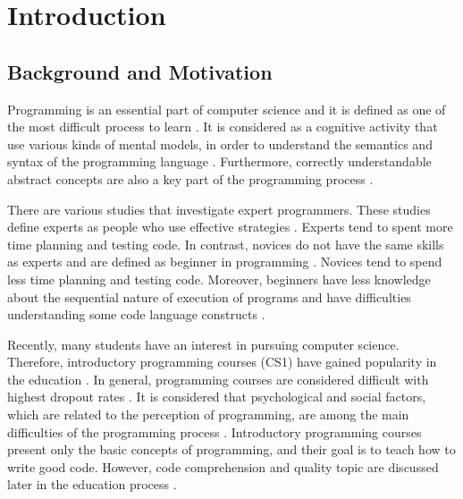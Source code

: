 %
%

\chapter{Introduction}
\label{sec:introduction}


\section{Background and Motivation}

Programming is an essential part of computer science and it is defined as one of the most difficult process to learn \cite{andrzejewska2020development}. It is considered as a cognitive activity that use various kinds of mental models, in order to understand the semantics and syntax of the programming language \cite{andrzejewska2020development}.
Furthermore, correctly understandable abstract concepts are also a key part of the programming process \cite{lahtinen2005study}.

There are various studies that investigate expert programmers. These studies define experts as people who use effective strategies \cite{robins2003learning}.   Experts tend to spent more time planning and testing code. In contrast, novices do not have the same skills as experts and are defined as beginner in programming \cite{robins2003learning}. Novices tend to spend less time planning and testing code. Moreover, beginners have less knowledge about the sequential nature of execution of programs and have difficulties understanding some code language constructs \cite{robins2003learning}.


Recently, many students have an interest in pursuing computer science. Therefore, introductory programming courses (CS1) have gained popularity in the education \cite{robins2003learning}. In general, programming courses are considered difficult with highest dropout rates \cite{robins2003learning}. It is considered that psychological and social factors, which are related to the perception of programming, are among the main difficulties of the programming process \cite{andrzejewska2020development}. Introductory programming courses present only the basic concepts of programming, and their goal is to teach how to write good code. However, code comprehension and quality topic are discussed later in the education process \cite{ inproceedings}.


